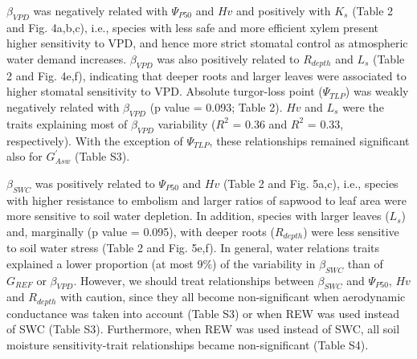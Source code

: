 \documentclass[11pt,twoside]{reedthesis}
\begin{document}
\(\beta_{VPD}\) was negatively related with
\textbar{}\(\Psi_{P50}\)\textbar{} and \(Hv\) and positively with
\(K_s\) (Table 2 and Fig. 4a,b,c), i.e., species with less safe and more
efficient xylem present higher sensitivity to VPD, and hence more strict
stomatal control as atmospheric water demand increases. \(\beta_{VPD}\)
was also positively related to \(R_{depth}\) and \(L_s\) (Table 2 and
Fig. 4e,f), indicating that deeper roots and larger leaves were
associated to higher stomatal sensitivity to VPD. Absolute turgor-loss
point (\textbar{}\(\Psi_{TLP}\)\textbar{}) was weakly negatively related
with \(\beta_{VPD}\) (p value = 0.093; Table 2). \(Hv\) and \(L_s\) were
the traits explaining most of \(\beta_{VPD}\) variability (\(R^2\) =
0.36 and \(R^2\) = 0.33, respectively). With the exception of
\(\Psi_{TLP}\), these relationships remained significant also for
\(G_{Asw}^{'}\) (Table S3).\par

\(\beta_{SWC}\) was positively related to
\textbar{}\(\Psi_{P50}\)\textbar{} and \(Hv\) (Table 2 and Fig. 5a,c),
i.e., species with higher resistance to embolism and larger ratios of
sapwood to leaf area were more sensitive to soil water depletion. In
addition, species with larger leaves (\(L_s\)) and, marginally (p value
= 0.095), with deeper roots (\(R_{depth}\)) were less sensitive to soil
water stress (Table 2 and Fig. 5e,f). In general, water relations traits
explained a lower proportion (at most 9\%) of the variability in
\(\beta_{SWC}\) than of \(G_{REF}\) or \(\beta_{VPD}\). However, we
should treat relationships between \(\beta_{SWC}\) and
\textbar{}\(\Psi_{P50}\)\textbar{}, \(Hv\) and \(R_{depth}\) with
caution, since they all become non-significant when aerodynamic
conductance was taken into account (Table S3) or when REW was used
instead of SWC (Table S3). Furthermore, when REW was used instead of
SWC, all soil moisture sensitivity-trait relationships became
non-significant (Table S4).\par
\end{document}
